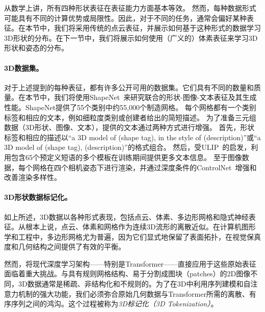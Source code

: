 \documentclass[../../book-main_zh.tex]{subfiles}
\begin{document}
从数学上讲，所有四种形状表征在表征能力方面基本等效。
然而，每种数据形式可能具有不同的计算优势或局限性。因此，对于不同的任务，通常会偏好某种表征。在本节中，我们将采用传统的点云表征，并展示如何基于这种形式的数据学习3D形状的分布。在下一节中，我们将展示如何使用（广义的）体素表征来学习3D形状和姿态的分布。

\paragraph{3D数据集。}
对于上述提到的每种表征，都有许多公开可用的数据集。它们具有不同的数量和质量。在本节中，我们将使用ShapeNet~\cite{chang2015shapenet}来研究联合的形状-图像-文本表征及其生成性能。ShapeNet提供了55个类别中约55,000个制造网格。
每个网格都有一个类别标签和相应的文本，例如细粒度类别或创建者给出的简短描述。
为了准备三元组数据（3D形状、图像、文本），提供的文本通过两种方式进行增强。
首先，形状标签和相应的描述以“a 3D model of (shape tag), in the style of (description)”或“a 3D model of (shape tag), (description)”的格式组合。
然后，受ULIP~\cite{10203465}的启发，利用包含65个预定义短语的多个模板在训练期间提供更多文本信息。
至于图像数据，每个网格在四个相机姿态下进行渲染，并通过深度条件的ControlNet~\cite{10377881}增强和改善渲染多样性。

\paragraph{3D形状数据标记化。}
\label{sec:3d_tokenization}
如上所述，3D数据以各种形式表现，包括点云、体素、多边形网格和隐式神经表征。从根本上说，点云、体素和网格作为连续3D流形的离散近似。在计算机图形学和工程中，多边形网格尤为普遍，因为它们显式地保留了表面拓扑，在视觉保真度和几何结构之间提供了有效的平衡。

然而，将现代深度学习架构——特别是Transformer——直接应用于这些原始表征面临着重大挑战。与具有规则网格结构、易于分割成图块（patches）的2D图像不同，3D数据通常是稀疏、非结构化和不规则的。为了在3D中利用序列建模和自注意力机制的强大功能，我们必须弥合原始几何数据与Transformer所需的离散、有序序列之间的鸿沟。这个过程被称为\textit{3D标记化（3D Tokenization）}。
\end{document}
